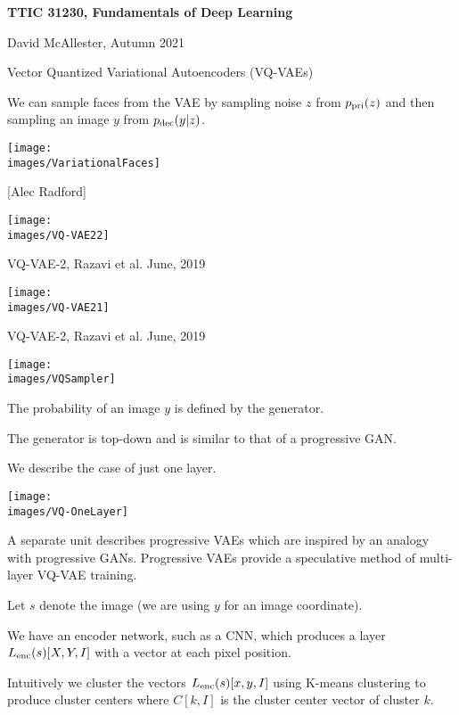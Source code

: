 





{\Huge

  \centerline{\bf TTIC 31230, Fundamentals of Deep Learning}
  \bigskip
  \centerline{David McAllester, Autumn 2021}
  \vfill
  \vfil
  \centerline{Vector Quantized Variational Autoencoders (VQ-VAEs)}
  \vfill
  \vfill


We can sample faces from the VAE by sampling noise $z$ from $p_{\mathrm{pri}}(z)$ and then sampling an image $y$ from $p_{\mathrm{dec}}(y|z)$.

\vfill
\centerline{\texttt{[image: \\images/VariationalFaces]}}
\centerline{[Alec Radford]}


\centerline{\texttt{[image: \\images/VQ-VAE22]}}

\vfill
VQ-VAE-2, Razavi et al. June, 2019


\centerline{\texttt{[image: \\images/VQ-VAE21]}}

\vfill
VQ-VAE-2, Razavi et al. June, 2019





\centerline{\texttt{[image: \\images/VQSampler]}}

\vfill
The probability of an image $y$ is defined by the generator.

\vfill
The generator is top-down and is similar to that of a progressive GAN.



We describe the case of just one layer.

\vfill
\centerline{\texttt{[image: \\images/VQ-OneLayer]}}

\vfill
A separate unit describes progressive VAEs which are inspired by an analogy with progressive GANs.  Progressive VAEs provide a speculative method
of multi-layer VQ-VAE training.


Let $s$ denote the image (we are using $y$ for an image coordinate).

\vfill
We have an encoder network, such as a CNN, which produces a layer $L_{\mathrm{enc}}(s)[X,Y,I]$ with a vector at each pixel position.

\vfill
Intuitively we cluster the vectors $L_{\mathrm{enc}}(s)[x,y,I]$ using K-means clustering to produce cluster centers where $C[k,I]$
is the cluster center vector of cluster $k$.

}

